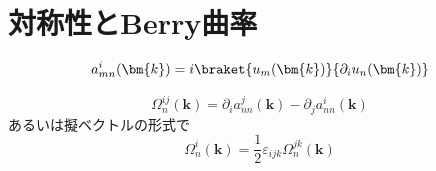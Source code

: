 \section{対称性とBerry曲率}
\begin{deftcolorbox}[title = Berry接続$a^{i}_{mn}(\bm{k})$]
    \begin{equation*}
        a^{i}_{mn}(\bm{k}) = i \braket{u_m(\bm{k})}{\partial_i u_n(\bm{k})}
    \end{equation*}
\end{deftcolorbox}

\begin{deftcolorbox}[title = Berry曲率$\Omega^{ij}_n(\bm{k})$]
    \begin{equation*}
        \Omega^{ij}_n(\bm{k}) = \partial_i a^{j}_{nn}(\bm{k}) - \partial_j a^{i}_{nn}(\bm{k})
    \end{equation*}
    あるいは擬ベクトルの形式で
    \begin{equation*}
        \Omega^i_n(\bm{k}) = \frac{1}{2} \varepsilon_{ijk} \Omega^{jk}_n(\bm{k})
    \end{equation*}
\end{deftcolorbox}

